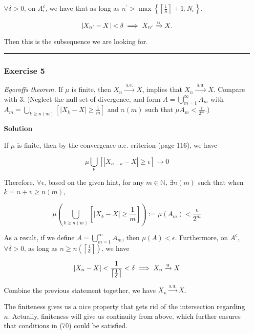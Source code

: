 \documentclass[
]{article}
\begin{document}
\(\forall \delta > 0\), on \(A_\epsilon^c\), we have that as long as
\(n^\prime > \max\left\{\left\lceil \frac{1}{\delta}\right\rceil + 1, N_{\epsilon}\right\}\),

\[|X_{n^\prime} - X| < \delta \implies X_{n^\prime} \xrightarrow{\text u} X.\]

Then this is the subsequence we are looking for.

\begin{center}\rule{0.5\linewidth}{0.5pt}\end{center}

\hypertarget{exercise-5-2}{%
  \subsubsection{Exercise 5}\label{exercise-5-2}}

\emph{Egoroff\textquotesingle s theorem.} If \(\mu\) is finite, then
\(X_n \stackrel{\text { a.e. }}{\longrightarrow} X\), implies that
\(X_n \stackrel{\text { a.u. }}{\longrightarrow} X\). Compare with 3.
(Neglect the null set of divergence, and form
\(A=\bigcup_{m=1}^{\infty} A_m\) with
\(A_m=\bigcup_{k \ge n(m)}\left[\left|X_k-X\right| \ge \frac{1}{m}\right]\)
and \(n(m)\) such that \(\mu A_m<\frac{\epsilon}{2^m}\).)

\textbf{Solution}

If \(\mu\) is finite, then by the convergence a.e. criterion (page 116),
we have

\[\mu \bigcup_\nu\left[\left|X_{n+\nu}-X\right| \ge \epsilon\right] \rightarrow 0\]

Therefore, \(\forall \epsilon\), based on the given hint, for any
\(m \in \mathbb N\), \(\exists n(m)\) such that when
\(k = n + v \ge n(m)\),

\[\mu \left(\bigcup_{k \ge n(m)}\left[\left|X_{k}-X\right| \ge \frac{1}{m}\right]\right) := \mu (A_m) < \frac{\epsilon}{2^m}\]

As a result, if we define \(A=\bigcup_{m=1}^{\infty} A_m\), then
\(\mu(A) < \epsilon\). Furthermore, on \(A^c\), \(\forall \delta > 0\),
as long as
\(n \ge n\left(\left\lceil \frac{1}{\delta}\right\rceil\right)\), we
have

\[|X_n - X| < \frac{1}{\left\lceil \frac{1}{\delta}\right\rceil} < \delta \implies X_n \xrightarrow{\text u} X\]

Combine the previous statement together, we have
\(X_n \xrightarrow{\text{a.u.}} X\).

The finiteness gives us a nice property that gets rid of the
intersection regarding \(n\). Actually, finiteness will give us
continuity from above, which further ensures that conditions in (70)
could be satisfied.
\end{document}
